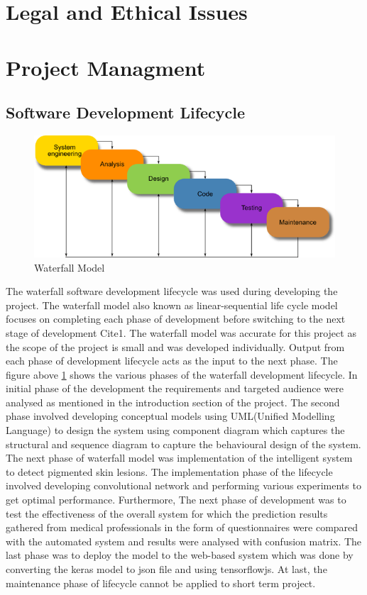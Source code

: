 \section{Legal and Ethical Issues}

\pagebreak

\section{Project Managment}

\subsection{Software Development Lifecycle}

\begin{figure}[!htp]
    \centering
    \includegraphics[width=.8\textwidth]{Images/waterfall}
    \caption{Waterfall Model}
    \label{fig:waterfall}
\end{figure}


The waterfall software development lifecycle was used during developing the project. The waterfall
model also known as linear-sequential life cycle model focuses on completing each phase of
development before switching to the next stage of development Cite{1}. The waterfall model was
accurate for this project as the scope of the project is small and was developed individually. Output
from each phase of development lifecycle acts as the input to the next phase. The figure above
\ref{fig:waterfall} shows the various phases of the waterfall development lifecycle. In initial phase of the
development the requirements and targeted audience were analysed as mentioned in the
introduction section of the project. The second phase involved developing conceptual models using
UML(Unified Modelling Language) to design the system using component diagram which captures
the structural and sequence diagram to capture the behavioural design of the system. The next
phase of waterfall model was implementation of the intelligent system to detect pigmented skin
lesions. The implementation phase of the lifecycle involved developing convolutional network and
performing various experiments to get optimal performance. Furthermore, The next phase of
development was to test the effectiveness of the overall system for which the prediction results
gathered from medical professionals in the form of questionnaires were compared with the
automated system and results were analysed with confusion matrix. The last phase was to deploy
the model to the web-based system which was done by converting the keras model to json file and
using tensorflowjs. At last, the maintenance phase of lifecycle cannot be applied to short term
project.

